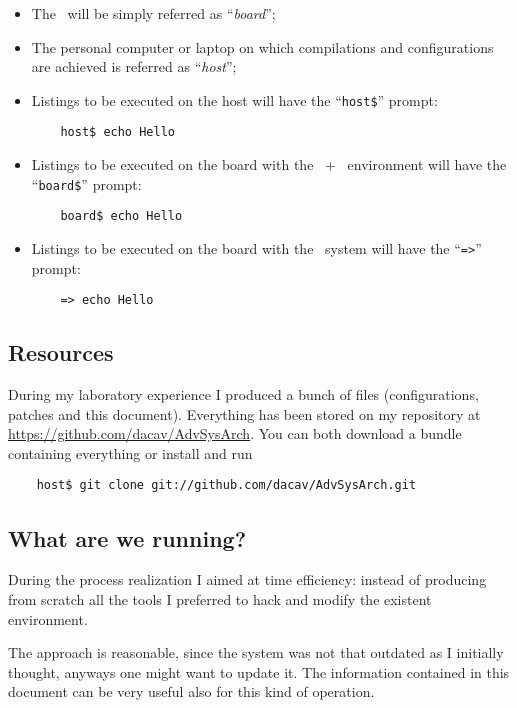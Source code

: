    \begin{itemize}

    \item   The \MyBoard\ will be simply referred as
            ``\emph{board}'';

    \item   The personal computer or laptop on which compilations and
            configurations are achieved is referred as ``\emph{host}'';

    \item   Listings to be executed on the host will have the
            ``\lstinline{host$}'' prompt:
\begin{lstlisting}
    host$ echo Hello
\end{lstlisting}

    \item   Listings to be executed on the board with the
            \BusyBox\ + \Linux\ environment will have the
            ``\lstinline{board$}'' prompt:
\begin{lstlisting}
    board$ echo Hello
\end{lstlisting}

    \item   Listings to be executed on the board with the \uBoot\
            system will have the ``\lstinline{=>}'' prompt:
\begin{lstlisting}
    => echo Hello
\end{lstlisting}

    \end{itemize}

\subsection{ Resources } \label{sub:Resources}

    During my laboratory experience I produced a bunch of files
    (configurations, patches and this document). Everything has been
    stored on my \TechName{Github} repository at
    \url{https://github.com/dacav/AdvSysArch}. You can both download a
    bundle containing everything or install \TechName{git} and run
\begin{lstlisting}
    host$ git clone git://github.com/dacav/AdvSysArch.git
\end{lstlisting}

\subsection{ What are we running? }

    During the process realization I aimed at time efficiency:
    instead of producing from scratch all the tools I preferred to
    hack and modify the existent environment.

    The approach is reasonable, since the system was not that
    outdated as I initially thought, anyways one might want to
    update it. The information contained in this document can be
    very useful also for this kind of operation.

